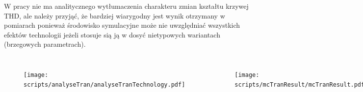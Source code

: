 \begin{frame}[t]
    \vspace{-1em}
    \begin{block}{\tb}
    \end{block}
W pracy nie ma analitycznego wytłumaczenia charakteru zmian kształtu krzywej THD, ale należy przyjąć, że bardziej wiarygodny jest wynik otrzymany w pomiarach ponieważ środowisko symulacyjne może nie uwzględniać wszystkich efektów technologii jeżeli stosuje sią ją w dosyć nietypowych wariantach (brzegowych parametrach).  
\vspace{-2em}

    \begin{columns}

    \begin{figure}[H]
    \centering
    \texttt{[image: scripts/analyseTran/analyseTranTechnology.pdf]}
    \end{figure}
        

    \begin{figure}[H]
        \centering
    \texttt{[image: scripts/mcTranResult/mcTranResult.pdf]}
    \end{figure}

    \begin{figure}[H]
        \centering
        \texttt{[image: scripts/embc2021THD\_size/embc2021THD\_size\_0\_100.pdf]}
    \end{figure}
        


    \end{columns}
\end{frame}



